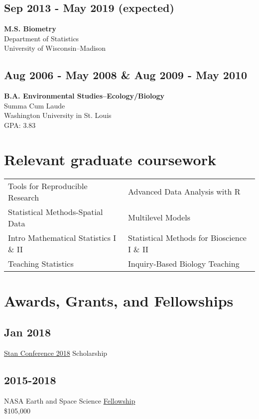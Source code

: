 \documentclass{article}
\begin{document}
\subsection*{Sep 2013 - May 2019 (expected)}
\label{sec:org62c79fb}
\textbf{M.S. Biometry} \\
Department of Statistics \\
University of Wisconsin--Madison

\subsection*{Aug 2006 - May 2008 \& Aug 2009 - May 2010}
\label{sec:org30ed92d}
\textbf{B.A. Environmental Studies--Ecology/Biology} \\
Summa Cum Laude \\
Washington University in St. Louis \\
GPA: 3.83

\section*{Relevant graduate coursework}
\label{sec:orgcaae541}
\begin{center}
\begin{tabular}{ll}
Tools for Reproducible Research & Advanced Data Analysis with R\\
Statistical Methods-Spatial Data & Multilevel Models\\
Intro Mathematical Statistics I \& II & Statistical Methods for Bioscience I \& II\\
Teaching Statistics & Inquiry-Based Biology Teaching\\
\end{tabular}
\end{center}

\section*{Awards, Grants, and Fellowships}
\label{sec:org5776a03}
\subsection*{Jan 2018}
\label{sec:orga4f0f79}
\href{http://mc-stan.org/events/}{Stan Conference 2018} Scholarship

\subsection*{2015-2018}
\label{sec:orgf56d161}
NASA Earth and Space Science \href{https://nspires.nasaprs.com/external/viewrepositorydocument/cmdocumentid=459947/solicitationId=\%7BB6CDCEA6-8EDD-A48A-FAF8-E588F66661C3\%7D/viewSolicitationDocument=1/NESSF15\%20selections.pdf}{Fellowship}\\
\$105,000
\end{document}

